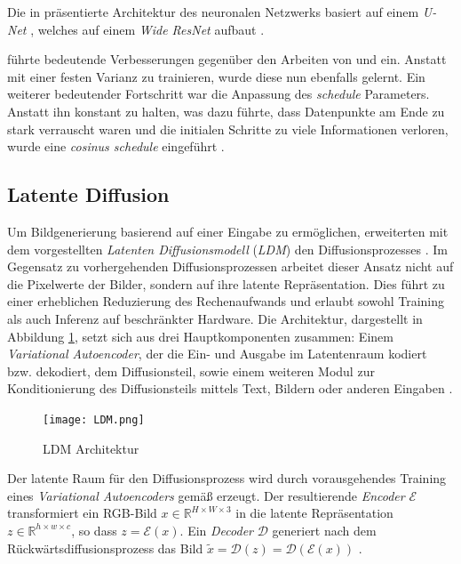 \documentclass[
  a4paper,  %
  twoside,  %
  bibliography=totoc,
  headsepline,
  cleardoublepage=empty,
  parskip=half,
  draft=false
]{scrbook}
\begin{document}
Die in \cite{ho_denoising_2020} präsentierte Architektur des neuronalen Netzwerks basiert auf einem \emph{U-Net} \cite{ronneberger_u-net_2015}, welches auf einem \emph{Wide ResNet} \cite{zagoruyko_wide_2017} aufbaut \cite{ho_denoising_2020}.

\cite{nichol_improved_2021} führte bedeutende Verbesserungen gegenüber den Arbeiten von \cite{sohl-dickstein_deep_2015} und \cite{ho_denoising_2020} ein. Anstatt mit einer festen Varianz zu trainieren, wurde diese nun ebenfalls gelernt. Ein weiterer bedeutender Fortschritt war die Anpassung des \emph{schedule} Parameters. Anstatt ihn konstant zu halten, was dazu führte, dass Datenpunkte am Ende zu stark verrauscht waren und die initialen Schritte zu viele Informationen verloren, wurde eine \emph{cosinus schedule} eingeführt \cite{nichol_improved_2021}.

\subsection{Latente Diffusion}

Um Bildgenerierung basierend auf einer Eingabe zu ermöglichen, erweiterten \cite{rombach_high-resolution_2022} mit dem vorgestellten  \emph{Latenten Diffusionsmodell} (\emph{LDM}) den Diffusionsprozesses \cite{sohl-dickstein_deep_2015, ho_denoising_2020, nichol_improved_2021, dhariwal_diffusion_2021}. Im Gegensatz zu vorhergehenden Diffusionsprozessen arbeitet dieser Ansatz nicht auf die Pixelwerte der Bilder, sondern auf ihre latente Repräsentation. Dies führt zu einer erheblichen Reduzierung des Rechenaufwands und erlaubt sowohl Training als auch Inferenz auf beschränkter Hardware. Die Architektur, dargestellt in Abbildung \ref{fig:LDM}, setzt sich aus drei Hauptkomponenten zusammen: Einem \emph{Variational Autoencoder}, der die Ein- und Ausgabe im Latentenraum kodiert bzw. dekodiert, dem Diffusionsteil, sowie einem weiteren Modul zur Konditionierung des Diffusionsteils mittels Text, Bildern oder anderen Eingaben \cite{rombach_high-resolution_2022}.

\begin{figure}[h]
  \centering
  \texttt{[image: LDM.png]}
  \caption[LDM Architektur]{LDM Architektur\cite{rombach_high-resolution_2022}}
  \label{fig:LDM}
\end{figure} 

Der latente Raum für den Diffusionsprozess wird durch vorausgehendes Training eines \emph{Variational Autoencoders} \cite{kingma_auto-encoding_2022} gemäß \cite{esser_taming_2021} erzeugt. Der resultierende \emph{Encoder} $\mathcal{E}$ transformiert ein RGB-Bild $x \in \mathbb{R}^{H \times W \times 3}$ in die latente Repräsentation $z \in \mathbb{R}^{h \times w \times c}$, so dass $z=\mathcal{E}(x)$. Ein \emph{Decoder} $\mathcal{D}$ generiert nach dem Rückwärtsdiffusionsprozess das Bild $\tilde{x}=\mathcal{D}(z)=\mathcal{D}(\mathcal{E}(x))$ \cite{rombach_high-resolution_2022}.
\end{document}
